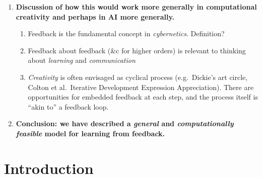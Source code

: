 \documentclass[letter]{article}
\newcommand{\dec}[1]{\raisebox{.2ex}{$\star$}#1\raisebox{.2ex}{$\star$}}
\begin{document}
{\begin{enumerate}[start=0,label=\textbf{\arabic*}]
\item \textbf{Discussion of how this would work more generally in
  computational creativity and perhaps in AI more generally.}
\begin{enumerate}
\item Feedback is the fundamental concept in \emph{cybernetics}.  \dec{Definition?}
\item Feedback about feedback (\&c for higher orders) is relevant to thinking about \emph{learning} and \emph{communication}
\item \emph{Creativity} is often envisaged as cyclical process (e.g.~Dickie's
  art circle, Colton et al.~Iterative
  Development Expression Appreciation).  There are opportunities for
  embedded feedback at each step, and the process itself is ``akin
  to'' a feedback loop.
\end{enumerate}
\item \textbf{Conclusion: we have described a \emph{general} and \emph{computationally feasible} model for learning from feedback.}
\end{enumerate}
}

\section{Introduction} \label{sec:introduction}

%
%
%
\end{document}
